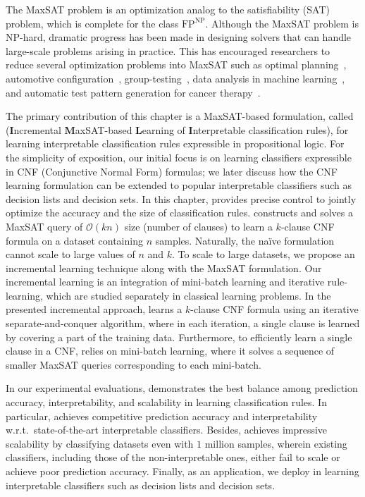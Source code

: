 The MaxSAT problem is an optimization analog to the satisfiability (SAT) problem, which is complete for the class $ \mathrm{FP}^{\mathrm{NP}} $. Although the MaxSAT problem is NP-hard, dramatic progress has been made in designing solvers that can handle large-scale problems arising in practice. This has encouraged researchers to reduce several optimization problems into MaxSAT such as  optimal planning~\cite{robinson2010partial}, automotive configuration~\cite{walter2013applications}, group-testing~\cite{CGSM2020}, data analysis in machine learning~\cite{berg2019applications}, and automatic test pattern generation for cancer therapy~\cite{lin2012application}. 

The primary contribution of this chapter is a MaxSAT-based formulation, called {\imli} (\textbf{I}ncremental \textbf{M}axSAT-based \textbf{L}earning of \textbf{I}nterpretable classification rules), for learning interpretable classification rules expressible in propositional logic. For the simplicity of exposition, our initial focus is on learning classifiers expressible in CNF (Conjunctive Normal Form) formulas; we later discuss how the CNF learning formulation can be extended to popular interpretable classifiers such as decision lists and decision sets. In this chapter, {\imli} provides precise control to jointly optimize the accuracy and the size of classification rules. {\imli} constructs and solves a MaxSAT query of $ \mathcal{O}(kn) $  size (number of clauses) to learn a $ k $-clause CNF formula on a dataset containing $ n $ samples. Naturally, the na\"ive formulation cannot scale to large values of $ n $ and $ k $. To scale {\imli} to large datasets, we propose an incremental learning technique along with the MaxSAT formulation. Our incremental learning is an integration of mini-batch learning and iterative rule-learning, which are studied separately in classical learning problems. In the presented incremental approach, {\imli} learns a $ k $-clause CNF formula using an iterative separate-and-conquer algorithm, where in each iteration, a single clause is learned by covering a part of the training data. Furthermore, to efficiently learn a single clause in a CNF, {\imli} relies on mini-batch learning, where it solves a sequence of smaller MaxSAT queries corresponding to each mini-batch. 

In our experimental evaluations, {\imli} demonstrates the best balance among prediction accuracy, interpretability, and scalability in learning classification rules. In particular, {\imli} achieves competitive prediction accuracy and interpretability w.r.t.\ state-of-the-art interpretable classifiers. Besides, {\imli} achieves impressive scalability by classifying datasets even with $ 1 $ million samples, wherein existing classifiers, including those of the non-interpretable ones, either fail to scale or achieve poor prediction accuracy. Finally, as an application, we deploy {\imli} in learning interpretable classifiers such as decision lists and decision sets.



